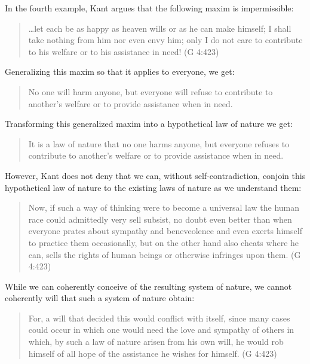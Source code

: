 In the fourth example, Kant argues that the following maxim is impermissible:

\begin{quote}
	\ldots let each be as happy as heaven wills or as he can make himself; I shall take nothing from him nor even envy him; only I do not care to contribute to his welfare or to his assistance in need! (G 4:423)
\end{quote}

Generalizing this maxim so that it applies to everyone, we get:

\begin{quote}
	No one will harm anyone, but everyone will refuse to contribute to another's welfare or to provide assistance when in need.
\end{quote}

Transforming this generalized maxim into a hypothetical law of nature we get:

\begin{quote}
	It is a law of nature that no one harms anyone, but everyone refuses to contribute to another's welfare or to provide assistance when in need.
\end{quote}

However, Kant does not deny that we can, without self-contradiction, conjoin this hypothetical law of nature to the existing laws of nature as we understand them:

\begin{quote}
	Now, if such a way of thinking were to become a universal law the human race could admittedly very sell subsist, no doubt even better than when everyone prates about sympathy and beneveolence and even exerts himself to practice them occasionally, but on the other hand also cheats where he can, sells the rights of human beings or otherwise infringes upon them. (G 4:423)
\end{quote}

While we can coherently conceive of the resulting system of nature, we cannot coherently will that such a system of nature obtain:

\begin{quote}
	For, a will that decided this would conflict with itself, since many cases could occur in which one would need the love and sympathy of others in which, by such a law of nature arisen from his own will, he would rob himself of all hope of the assistance he wishes for himself. (G 4:423)
\end{quote}

\change

